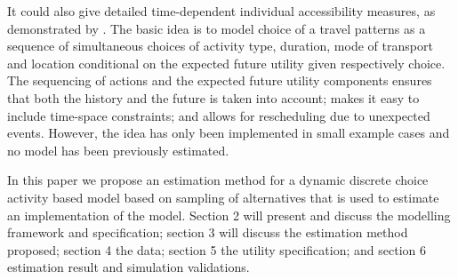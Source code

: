 It could also give detailed time-dependent individual accessibility measures, as demonstrated by \citet{Jonsson13}. The basic idea is to model choice of a travel patterns as a sequence of simultaneous choices of activity type, duration, mode of transport and location conditional on the expected future utility given respectively choice. The sequencing of actions and the expected future utility components ensures that both the history and the future is taken into account; makes it easy to include time-space constraints; and allows for rescheduling due to unexpected events. However, the idea has only been implemented in small example cases and no model has been previously estimated. 

In this paper we propose an estimation method for a dynamic discrete choice activity based model based on sampling of alternatives that is used to estimate an implementation of the model. Section 2 will present and discuss the modelling framework and specification; section 3 will discuss the estimation method proposed; section 4 the data; section 5 the utility specification; and section 6 estimation result and simulation validations.
